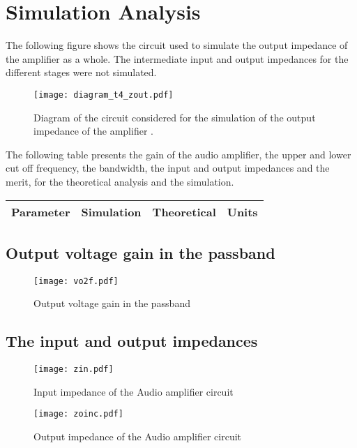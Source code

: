 \section{Simulation Analysis}
\label{sec:simulation}

The following figure shows the circuit used to simulate the output impedance of the amplifier as a whole. The intermediate input and output impedances for the different stages were not simulated.

\begin{figure}[H] \centering
\texttt{[image: diagram\_t4\_zout.pdf]}
\vspace{-10cm}
\caption{Diagram of the circuit considered for the simulation of the output impedance of the amplifier .}
\label{fig:diagram_t4_zout}
\end{figure}


The following table presents the gain of the audio amplifier, the upper and lower cut off frequency, the bandwidth, the input and output impedances and the merit, for the theoretical analysis and the simulation.

\hfill
 \parbox{1\linewidth}{
  \centering
  \begin{tabular}{|l|l|l|r|}
    \hline    
    {\bf Parameter} & {\bf Simulation} & {\bf Theoretical } & {\bf Units }\\ \hline
    
  \end{tabular}
  \label{tab:results}
  }

  

\subsection{Output voltage gain in the passband}
\par
\vspace{-4cm}
\begin{figure}[H] \centering
\texttt{[image: vo2f.pdf]}
\vspace{-1cm}
\caption{Output voltage gain in the passband}
\label{fig:gain_sim}
\end{figure}


\subsection{The input and output impedances}

\begin{figure}[H] \centering
\texttt{[image: zin.pdf]}
\caption{Input impedance of the Audio amplifier circuit}
\label{fig:In_imp}
\end{figure}
\vspace{-3cm}


\begin{figure}[H] \centering
\texttt{[image: zoinc.pdf]}
\caption{Output impedance of the Audio amplifier circuit}
\label{fig:out_imp}
\end{figure}
\vspace{-3cm}


\pagebreak
